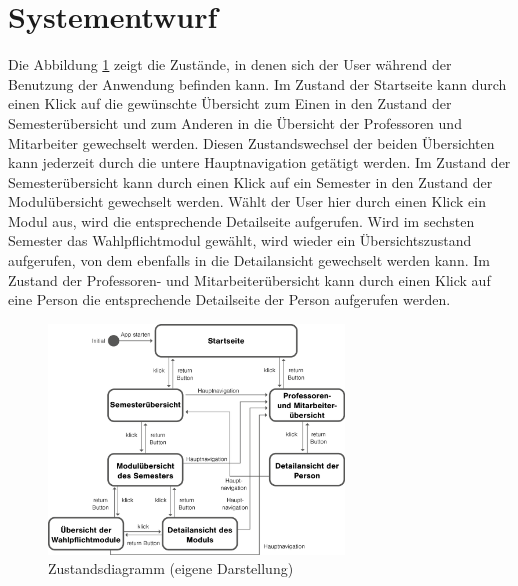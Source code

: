 \documentclass[12pt,					%
							 oneside,			%
							 a4paper,			%
							 halfparskip,		%
							 liststotoc,			%
							 bibtotoc,			%
							 fleqn,				%
							 pointlessnumbers]	%
							 {scrreprt}
\begin{document}
		\section{Systementwurf}
		Die Abbildung \ref{Zustandsdiagramm} zeigt die Zustände, in denen sich der User während der Benutzung der Anwendung befinden kann. Im Zustand der Startseite kann durch einen Klick auf die gewünschte Übersicht zum Einen in den Zustand der Semesterübersicht und zum Anderen in die Übersicht der Professoren und Mitarbeiter gewechselt werden. Diesen Zustandswechsel der beiden Übersichten kann jederzeit durch die untere Hauptnavigation getätigt werden. Im Zustand der Semesterübersicht kann durch einen Klick auf ein Semester in den Zustand der Modulübersicht gewechselt werden. Wählt der User hier durch einen Klick ein Modul aus, wird die entsprechende Detailseite aufgerufen. Wird im sechsten Semester das Wahlpflichtmodul gewählt, wird wieder ein Übersichtszustand aufgerufen, von dem ebenfalls in die Detailansicht gewechselt werden kann. Im Zustand der Professoren- und Mitarbeiterübersicht kann durch einen Klick auf eine Person die entsprechende Detailseite der Person aufgerufen werden.			
		\begin{figure}[h]
			\centering
			\includegraphics[width=0.7\textwidth]{pictures/zustandsdiagram.png}
			\caption{Zustandsdiagramm (eigene Darstellung)}						
			\label{Zustandsdiagramm}
		\end{figure}
\newpage					
\end{document}
